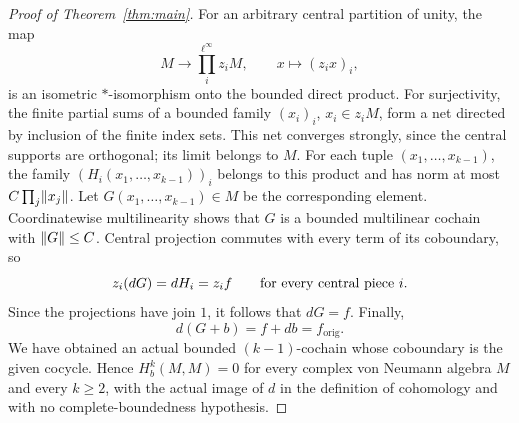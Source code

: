 \begin{proof}[Proof of Theorem~\ref{thm:main}]
For an arbitrary central partition of unity, the map
\[
 M\longrightarrow\prod_i^{\ell^\infty}z_iM,
 \qquad x\longmapsto(z_ix)_i,
\]
is an isometric $*$-isomorphism onto the bounded direct product.
For surjectivity, the finite partial sums of a bounded family
$(x_i)_i$, $x_i\in z_iM$, form a net directed by inclusion of the
finite index sets.  This net converges strongly, since the central
supports are orthogonal; its limit belongs to $M$.
For each tuple $(x_1,\ldots,x_{k-1})$, the family
$(H_i(x_1,\ldots,x_{k-1}))_i$ belongs to this product and has norm
at most $C\prod_j\lVert x_j\rVert$.  Let $G(x_1,\ldots,x_{k-1})\in M$
be the corresponding element.  Coordinatewise multilinearity
shows that $G$ is a bounded multilinear cochain with
$\lVert G\rVert\le C$.  Central projection commutes with every term
of its coboundary, so
\[
 z_i(dG)=dH_i=z_if
 \qquad\hbox{for every central piece }i.
\]
Since the projections have join $1$, it follows that $dG=f$.
Finally,
\[
 d(G+b)=f+db=f_{\mathrm{orig}}.
\]
We have obtained an actual bounded $(k-1)$-cochain whose
coboundary is the given cocycle.  Hence
$H_b^k(M,M)=0$ for every complex von Neumann algebra $M$ and
every $k\ge2$, with the actual image of $d$ in the definition of
cohomology and with no complete-boundedness hypothesis.
\end{proof}
